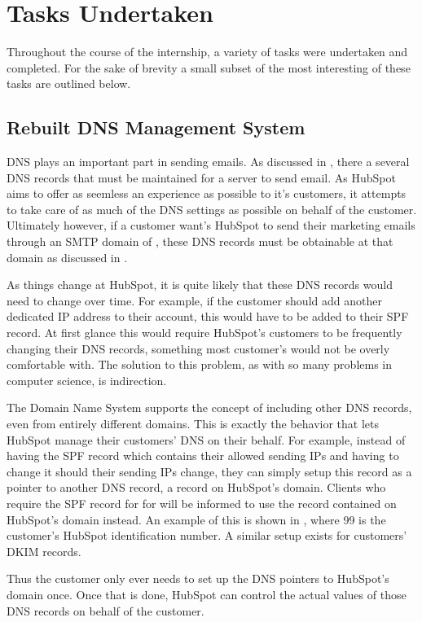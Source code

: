 \chapter{Tasks Undertaken}
Throughout the course of the internship, a variety of tasks were undertaken and completed.  
For the sake of brevity a small subset of the most interesting of these tasks are outlined below. 

\section{Rebuilt DNS Management System}
DNS plays an important part in sending emails. As discussed in , there a several DNS records that must be maintained for a server to send email. As HubSpot aims to offer as seemless an experience as possible to it's customers, it attempts to take care of as much of the DNS settings as possible on behalf of the customer. Ultimately however, if a customer want's HubSpot to send their marketing emails through an SMTP domain of , these DNS records must be obtainable at that domain as discussed in . 

As things change at HubSpot, it is quite likely that these DNS records would need to change over time. For example, if the customer should add another dedicated IP address to their account, this would have to be added to their SPF record. At first glance this would require HubSpot's customers to be frequently changing their DNS records, something most customer's would not be overly comfortable with. The solution to this problem, as with so many problems in computer science, is indirection. 

The Domain Name System supports the concept of including other DNS records, even from entirely different domains. This is exactly the behavior that lets HubSpot manage their customers' DNS on their behalf. For example, instead of  having the SPF record which contains their allowed sending IPs and having to change it should their sending IPs change, they can simply setup this record as a pointer to another DNS record, a record on HubSpot's domain. Clients who require the SPF record for for  will be informed to use the record contained on HubSpot's domain instead. An example of this is shown in , where 99 is the customer's HubSpot identification number. A similar setup exists for customers' DKIM records.

Thus the customer only ever needs to set up the DNS pointers to HubSpot's domain once. Once that is done, HubSpot can control the actual values of those DNS records on behalf of the customer. 

